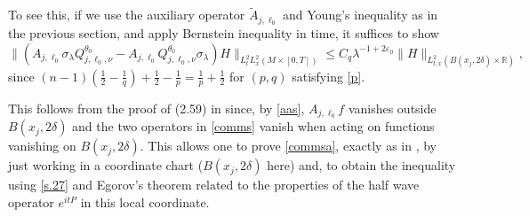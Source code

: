 \documentclass[10pt]{amsart}
\newcommand{\la}{\lambda}
\newcommand{\e}{\varepsilon}
\newcommand{\1}{{\bf 1}}
\newcommand{\R}{{\mathbb R}}
\begin{document}
To see this, if we use the auxiliary operator $\tilde A_{j,\ell_0}$ and Young's inequality as in the previous section, and apply Bernstein inequality in time, it suffices to show 
\begin{equation}\label{commsa}
\bigl\| (A_{j,\ell_0}\sigma_\la Q^{\theta_0}_{j,\ell_0,\nu}-A_{j,\ell_0}Q^{\theta_0}_{j,\ell_0,\nu}\sigma_\la)H\|_{L^2_tL^2_x(M\times [0,T])}
\le C_q \la^{-1+2\e_0}\|H\|_{L^2_{t,x}(B(x_j,2\delta)\times \R)},
\end{equation}
since $(n-1)(\frac12-\frac1q)+\frac12-\frac1p=\frac1p+\frac12$ for $(p,q)$ satisfying \eqref{p}.






This follows from the 
proof of (2.59) in \cite{HSst} since, by \eqref{aas}, $A_{j,\ell_0}f$ vanishes outside
$B(x_j,2\delta)$ and the two operators in \eqref{comms} vanish when acting on functions vanishing on
$B(x_j,2\delta)$.  This
allows one to prove \eqref{commsa},
exactly as in \cite{HSp},  by just working in a coordinate chart
($B(x_j,2\delta)$ here) and, to obtain the inequality
using \eqref{s.27} and  Egorov's theorem related to the properties of the half wave operator $e^{itP}$ in this local coordinate.
\end{document}
